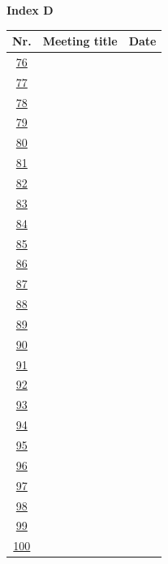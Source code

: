 \documentclass[aspectratio=43]{article}
\begin{document}
\newpage


\hypertarget{indexD}{}

{\normalsize\textbf{Index D}}

\begin{center}
	\begin{scriptsize}
		
		\renewcommand{\arraystretch}{2.15}
		
		\begin{tabular}{c|p{}|p{}}
			\textbf{Nr.} & \textbf{Meeting title} & \textbf{Date} \\
			\hline
			\hyperlink{p76}{76} & & \\ \hline
			\hyperlink{p77}{77} & & \\ \hline
			\hyperlink{p78}{78} & & \\ \hline
			\hyperlink{p79}{79} & & \\ \hline
			\hyperlink{p80}{80} & & \\ \hline
			\hyperlink{p81}{81} & & \\ \hline
			\hyperlink{p82}{82} & & \\ \hline
			\hyperlink{p83}{83} & & \\ \hline
			\hyperlink{p84}{84} & & \\ \hline
			\hyperlink{p85}{85} & & \\ \hline
			\hyperlink{p86}{86} & & \\ \hline
			\hyperlink{p87}{87} & & \\ \hline
			\hyperlink{p88}{88} & & \\ \hline
			\hyperlink{p89}{89} & & \\ \hline
			\hyperlink{p90}{90} & & \\ \hline
			\hyperlink{p91}{91} & & \\ \hline
			\hyperlink{p92}{92} & & \\ \hline
			\hyperlink{p93}{93} & & \\ \hline
			\hyperlink{p94}{94} & & \\ \hline
			\hyperlink{p95}{95} & & \\ \hline
			\hyperlink{p96}{96} & & \\ \hline
			\hyperlink{p97}{97} & & \\ \hline
			\hyperlink{p98}{98} & & \\ \hline
			\hyperlink{p99}{99} & & \\ \hline
			\hyperlink{p100}{100} & & \\
		\end{tabular}
		
	\end{scriptsize}
\end{center}
\end{document}
